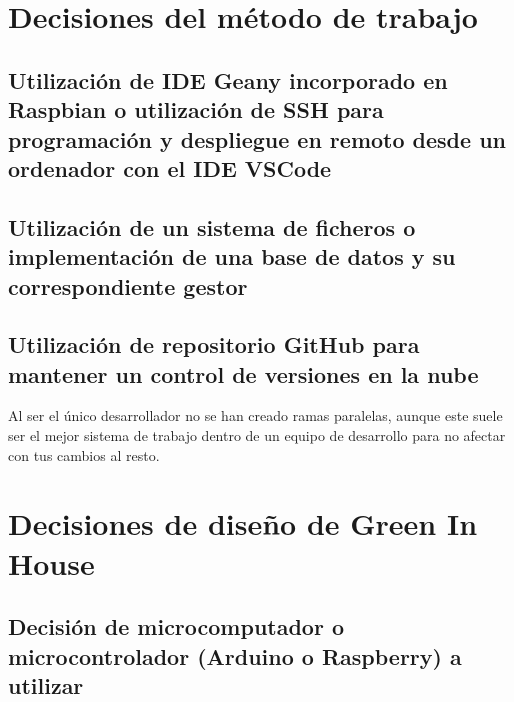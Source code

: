 


\section{Decisiones del método de trabajo}

    \subsection{Utilización de IDE Geany incorporado en Raspbian o utilización de SSH para programación y despliegue en remoto desde un ordenador con el IDE VSCode}


    \subsection{Utilización de un sistema de ficheros o implementación de una  base de datos y su correspondiente gestor}
    
    \subsection{Utilización de repositorio GitHub para mantener un control de versiones en la nube}
    Al ser el único desarrollador no se han creado ramas paralelas, aunque este suele ser el mejor sistema de trabajo dentro de un equipo de desarrollo para no afectar con tus cambios al resto.


\section{Decisiones de diseño de Green In House}

    \subsection{Decisión de microcomputador o microcontrolador (Arduino o Raspberry) a utilizar}    

